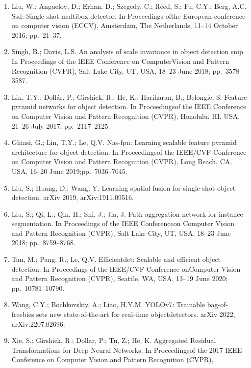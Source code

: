 \documentclass[
  10
]{article}
\begin{document}
\begin{enumerate}
  Glenn, J. Yolov5-6.1---TensorRT, TensorFlow Edge TPU and OpenVINO
  Export and Inference. 2022. Available online:
  https://github.com/ultralytics/yolov5/releases/tag/v6.1 (accessed on
  22 February 2022).
\item
  Liu, W.; Anguelov, D.; Erhan, D.; Szegedy, C.; Reed, S.; Fu, C.Y.;
  Berg, A.C. Ssd: Single shot multibox detector. In Proceedings ofthe
  European conference on computer vision (ECCV), Amsterdam, The
  Netherlands, 11--14 October 2016; pp.~21--37.
\item
  Singh, B.; Davis, L.S. An analysis of scale invariance in object
  detection snip. In Proceedings of the IEEE Conference on
  ComputerVision and Pattern Recognition (CVPR), Salt Lake City, UT,
  USA, 18--23 June 2018; pp.~3578--3587.
\item
  Lin, T.Y.; Dollár, P.; Girshick, R.; He, K.; Hariharan, B.; Belongie,
  S. Feature pyramid networks for object detection. In Proceedingsof the
  IEEE Conference on Computer Vision and Pattern Recognition (CVPR),
  Honolulu, HI, USA, 21--26 July 2017; pp.~2117--2125.
\item
  Ghiasi, G.; Lin, T.Y.; Le, Q.V. Nas-fpn: Learning scalable feature
  pyramid architecture for object detection. In Proceedingsof the
  IEEE/CVF Conference on Computer Vision and Pattern Recognition (CVPR),
  Long Beach, CA, USA, 16--20 June 2019;pp.~7036--7045.
\item
  Liu, S.; Huang, D.; Wang, Y. Learning spatial fusion for single-shot
  object detection. arXiv 2019, arXiv:1911.09516.
\item
  Liu, S.; Qi, L.; Qin, H.; Shi, J.; Jia, J. Path aggregation network
  for instance segmentation. In Proceedings of the IEEE Conferenceon
  Computer Vision and Pattern Recognition (CVPR), Salt Lake City, UT,
  USA, 18--23 June 2018; pp.~8759--8768.
\item
  Tan, M.; Pang, R.; Le, Q.V. Efficientdet: Scalable and efficient
  object detection. In Proceedings of the IEEE/CVF Conference onComputer
  Vision and Pattern Recognition (CVPR), Seattle, WA, USA, 13--19 June
  2020; pp.~10781--10790.
\item
  Wang, C.Y.; Bochkovskiy, A.; Liao, H.Y.M. YOLOv7: Trainable
  bag-of-freebies sets new state-of-the-art for real-time
  objectdetectors. arXiv 2022, arXiv:2207.02696.
\item
  Xie, S.; Girshick, R.; Dollar, P.; Tu, Z.; He, K. Aggregated Residual
  Transformations for Deep Neural Networks. In Proceedingsof the 2017
  IEEE Conference on Computer Vision and Pattern Recognition (CVPR),

\end{enumerate}
\end{document}
